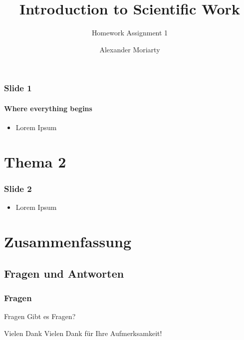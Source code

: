 \documentclass[ngerman,hyperref={pdfpagelabels=false}]{beamer}
\title{Introduction to Scientific Work}
\subtitle{Homework Assignment 1}
\author{Alexander Moriarty}
\institute[Hochschule Bonn-Rhein-Sieg]{Hochschule Bonn-Rhein-Sieg}
\date{\date{}}
\begin{document}
\begin{frame}
    \titlepage
\end{frame}

\begin{frame}
    \tableofcontents
\end{frame}


\begin{frame}
    \frametitle{Slide 1}
    \framesubtitle{Where everything begins}
    \begin{itemize}
        \item Lorem Ipsum
    \end{itemize}
\end{frame}

\section{Thema 2}

\begin{frame}
    \frametitle{Slide 2}
    \begin{itemize}
        \item Lorem Ipsum
    \end{itemize}
\end{frame}

\section{Zusammenfassung}
\subsection{Fragen und Antworten}
\begin{frame}
    \frametitle{Fragen}
    \begin{block}{Fragen}
        Gibt es Fragen?
    \end{block}
    \pause
    \begin{block}{Vielen Dank}
        Vielen Dank für Ihre Aufmerksamkeit!
    \end{block}
\end{frame}
\end{document}

